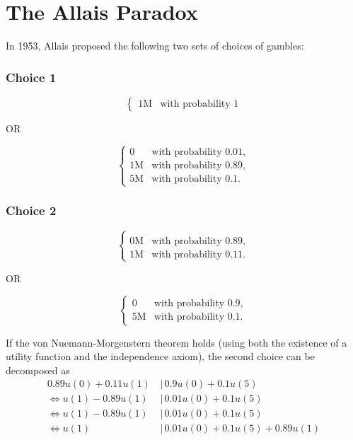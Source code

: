 \documentclass{article}
\begin{document}
\section{The Allais Paradox} 

In 1953, Allais proposed the following two sets of choices of gambles:

\subsubsection{Choice 1}

\begin{equation*}
\left\{
\begin{array}{rl}
1\text{M} & \text{with probability } 1
\end{array} \right.
\end{equation*}

OR

\begin{equation*}
\left\{
\begin{array}{rl}
0 & \text{with probability } 0.01,
\\1\text{M} & \text{with probability } 0.89,
\\5\text{M} & \text{with probability } 0.1.
\end{array} \right.
\end{equation*}

\subsubsection{Choice 2}

\begin{equation*}
\left\{
\begin{array}{rl}
\\0\text{M} & \text{with probability } 0.89,
\\1\text{M} & \text{with probability } 0.11.
\end{array} \right.
\end{equation*}

OR

\begin{equation*}
\left\{
\begin{array}{rl}
0 & \text{with probability } 0.9,
\\5\text{M} & \text{with probability } 0.1.
\end{array} \right.
\end{equation*}

If the von Nuemann-Morgenstern theorem holds (using both the existence of a utility function and the independence axiom), the second choice can be decomposed as 
\begin{align*}
0.89u(0)+0.11u(1)\, &|\, 0.9u(0)+0.1u(5) \\
\Leftrightarrow u(1)-0.89u(1) \, &|\, 0.01u(0)+0.1u(5) \\
\Leftrightarrow u(1)-0.89u(1) \, &|\, 0.01u(0)+0.1u(5) \\
\Leftrightarrow u(1) \, &|\, 0.01u(0)+0.1u(5)+0.89u(1)
\end{align*}
\end{document}
